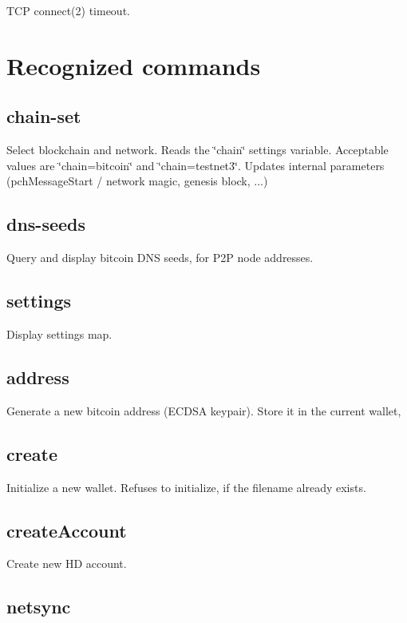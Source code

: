 T\-C\-P connect(2) timeout.

\section*{Recognized commands }

\subsection*{chain-\/set }

Select blockchain and network. Reads the \char`\"{}chain\char`\"{} settings variable. Acceptable values are \char`\"{}chain=bitcoin\char`\"{} and \char`\"{}chain=testnet3\char`\"{}. Updates internal parameters (pch\-Message\-Start / network magic, genesis block, ...)

\subsection*{dns-\/seeds }

Query and display bitcoin D\-N\-S seeds, for P2\-P node addresses.

\subsection*{settings }

Display settings map.

\subsection*{address }

Generate a new bitcoin address (E\-C\-D\-S\-A keypair). Store it in the current wallet,

\subsection*{create }

Initialize a new wallet. Refuses to initialize, if the filename already exists.

\subsection*{create\-Account }

Create new H\-D account.

\subsection*{netsync }

